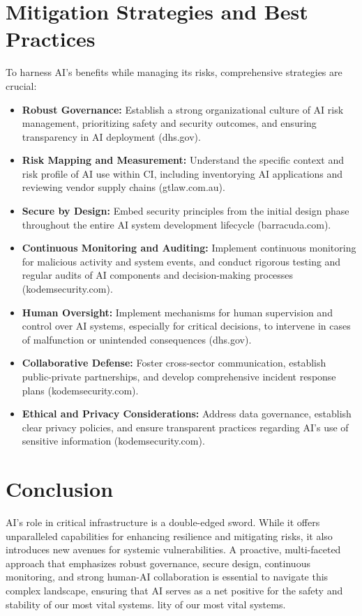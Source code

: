 \section{Mitigation Strategies and Best Practices}
To harness AI's benefits while managing its risks, comprehensive strategies are crucial:
\begin{itemize}
    \item \textbf{Robust Governance:} Establish a strong organizational culture of AI risk management, prioritizing safety and security outcomes, and ensuring transparency in AI deployment (dhs.gov).
    \item \textbf{Risk Mapping and Measurement:} Understand the specific context and risk profile of AI use within CI, including inventorying AI applications and reviewing vendor supply chains (gtlaw.com.au).
    \item \textbf{Secure by Design:} Embed security principles from the initial design phase throughout the entire AI system development lifecycle (barracuda.com).
    \item \textbf{Continuous Monitoring and Auditing:} Implement continuous monitoring for malicious activity and system events, and conduct rigorous testing and regular audits of AI components and decision-making processes (kodemsecurity.com).
    \item \textbf{Human Oversight:} Implement mechanisms for human supervision and control over AI systems, especially for critical decisions, to intervene in cases of malfunction or unintended consequences (dhs.gov).
    \item \textbf{Collaborative Defense:} Foster cross-sector communication, establish public-private partnerships, and develop comprehensive incident response plans (kodemsecurity.com).
    \item \textbf{Ethical and Privacy Considerations:} Address data governance, establish clear privacy policies, and ensure transparent practices regarding AI's use of sensitive information (kodemsecurity.com).
\end{itemize}

\section{Conclusion}
AI's role in critical infrastructure is a double-edged sword. While it offers unparalleled capabilities for enhancing resilience and mitigating risks, it also introduces new avenues for systemic vulnerabilities. A proactive, multi-faceted approach that emphasizes robust governance, secure design, continuous monitoring, and strong human-AI collaboration is essential to navigate this complex landscape, ensuring that AI serves as a net positive for the safety and stability of our most vital systems.
lity of our most vital systems.
